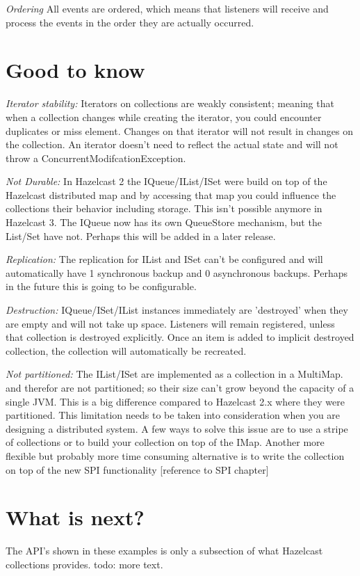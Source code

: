 \emph{Ordering} All events are ordered, which means that listeners will receive and process the events in the order they are actually occurred. 

\section{Good to know}

\emph{Iterator stability:} Iterators on collections are weakly consistent; meaning that when a collection changes while creating the iterator, you could encounter duplicates or miss element. Changes on that iterator will not result in changes on the collection. An iterator doesn't need to reflect the actual state and will not throw a ConcurrentModifcationException. 

\emph{Not Durable:} In Hazelcast 2 the IQueue/IList/ISet were build on top of the Hazelcast distributed map and by accessing that map you could influence the collections their behavior including storage. This isn't possible anymore in Hazelcast 3. The IQueue now has its own QueueStore mechanism, but the List/Set have not. Perhaps this will be added in a later release.

\emph{Replication:} The replication for IList and ISet can't be configured and will automatically have 1 synchronous backup and 0 asynchronous backups. Perhaps in the future this is going to be configurable.


\emph{Destruction:} IQueue/ISet/IList instances immediately are 'destroyed' when they are empty and will not take up space. Listeners will remain registered, unless that collection is destroyed explicitly. Once an item is added to implicit destroyed collection, the collection will automatically be recreated.

\emph{Not partitioned:}  The IList/ISet are implemented as a collection in a MultiMap. and therefor are not partitioned; so their size can't grow beyond the capacity of a single JVM. This is a big difference compared to Hazelcast 2.x where they were partitioned. This limitation needs to be taken into consideration when you are designing a distributed system. A few ways to solve this issue are to use a stripe of collections or to build your collection on top of the IMap. Another more flexible but probably more time consuming alternative is to write the collection on top of the new SPI functionality [reference to SPI chapter]

\section{What is next?}
The API's shown in these examples is only a subsection of what Hazelcast collections provides. todo: more text.